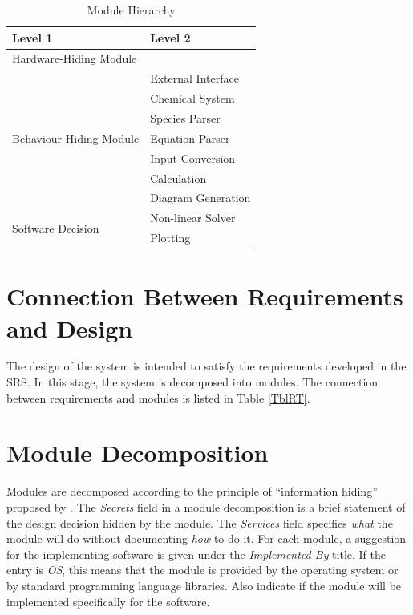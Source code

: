 \documentclass[12pt, titlepage]{article}
\begin{document}
\begin{table}[h!]
\centering
\begin{tabular}{p{} p{}}
\toprule
\textbf{Level 1} & \textbf{Level 2}\\
\midrule

{Hardware-Hiding Module} & ~ \\
\midrule

\multirow{7}{0.3\textwidth}{Behaviour-Hiding Module} & External Interface\\
& Chemical System\\
& Species Parser\\
& Equation Parser\\
& Input Conversion\\
& Calculation\\
& Diagram Generation\\ 
\midrule

\multirow{2}{0.3\textwidth}{Software Decision} & Non-linear Solver\\
& Plotting\\
\bottomrule

\end{tabular}
\caption{Module Hierarchy}
\label{TblMH}
\end{table}

\section{Connection Between Requirements and Design} \label{SecConnection}

The design of the system is intended to satisfy the requirements developed in
the SRS. In this stage, the system is decomposed into modules. The connection
between requirements and modules is listed in Table \ref{TblRT}.

\section{Module Decomposition} \label{SecMD}

Modules are decomposed according to the principle of ``information hiding''
proposed by \citet{ParnasEtAl1984}. The \emph{Secrets} field in a module
decomposition is a brief statement of the design decision hidden by the
module. The \emph{Services} field specifies \emph{what} the module will do
without documenting \emph{how} to do it. For each module, a suggestion for the
implementing software is given under the \emph{Implemented By} title. If the
entry is \emph{OS}, this means that the module is provided by the operating
system or by standard programming language libraries.  Also indicate if the
module will be implemented specifically for the software.
\end{document}
